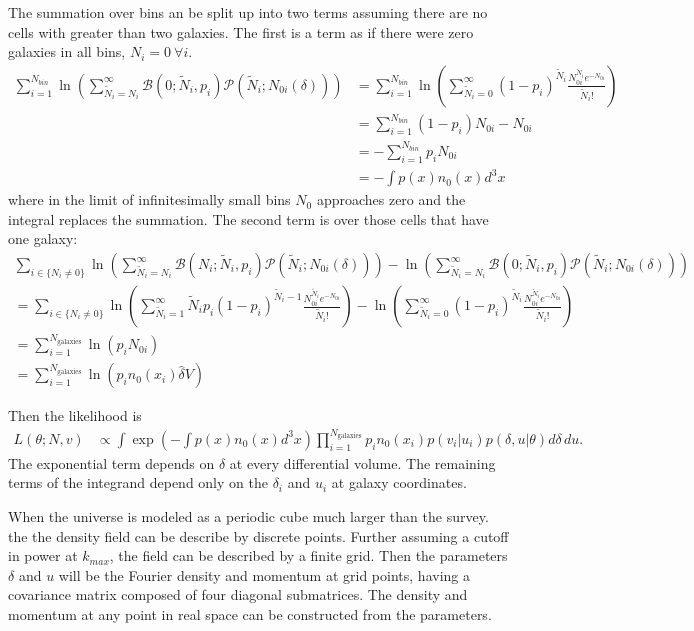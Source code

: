 \documentclass{article}
\begin{document}
The summation over bins an be split up into two terms assuming there are no cells with greater than two galaxies.
The first is a term as if there were zero galaxies in all bins, $N_i=0\ \forall i$.
\begin{align}
 \sum_{i=1}^{N_{bin}} \ln{  \left( \sum_{\tilde{N}_i =N_i}^\infty  \mathcal{B}(0; \tilde{N}_i, p_i) \mathcal{P}(\tilde{N}_i ; N_{0i}(\delta))\right)} & =
\sum_{i=1}^{N_{bin}} \ln{  \left( \sum_{\tilde{N}_i =0}^\infty   (1-p_i)^{ \tilde{N}_i} \frac{N_{0i}^{\tilde{N}_i} e^{-N_{0i}}}{\tilde{N}_i!} \right)}\\ 
& = \sum_{i=1}^{N_{bin}} (1-p_i)N_{0i} - N_{0i}\\
& = - \sum_{i=1}^{N_{bin}} p_i N_{0i}  \\
& = - \int  p(x) n_{0}(x) d^3x
\end{align}
where in the limit of  infinitesimally small bins $N_{0}$ approaches zero and
the integral replaces the summation.
The second term is over those cells that have one galaxy:
\begin{align}
\sum_{i \in \{N_i \ne 0\}}
\ln{  \left( \sum_{\tilde{N}_i =N_i}^\infty  \mathcal{B}(N_i; \tilde{N}_i, p_i) \mathcal{P}(\tilde{N}_i ; N_{0i}(\delta))\right)} -
 \ln{  \left( \sum_{\tilde{N}_i =N_i}^\infty  \mathcal{B}(0; \tilde{N}_i, p_i) \mathcal{P}(\tilde{N}_i ; N_{0i}(\delta))\right)}\\
 =\sum_{i \in \{N_i \ne 0\}} \ln{  \left( \sum_{\tilde{N}_i =1}^\infty   \tilde{N}_i p_i (1-p_i)^{ \tilde{N}_i-1} \frac{N_{0i}^{\tilde{N}_i} e^{-N_{0i}}}{\tilde{N}_i!} \right)}
- \ln{  \left( \sum_{\tilde{N}_i =0}^\infty   (1-p_i)^{ \tilde{N}_i} \frac{N_{0i}^{\tilde{N}_i} e^{-N_{0i}}}{\tilde{N}_i!} \right)} \\
 = \sum_{i=1}^{N_{\text{galaxies}}} \ln{  \left(  p_i  {N_{0i} } \right)} \\
  = \sum_{i=1}^{N_{\text{galaxies}}} \ln{  \left(  p_i  n_{0}(x_i) \hat{\delta} V \right)}
\end{align}

Then the likelihood is
\begin{align}
L(\theta; N, v) 
&\propto \int  \exp \left(- \int  p(x) n_{0}(x) d^3x\right)  \prod_{i=1}^{N_{\text{galaxies}}} p_i n_0(x_i) p(v_i| u_i) p(\delta, u | \theta) d\delta\, du .
\end{align}
The exponential term depends on $\delta$ at every differential volume.  The
remaining terms of the integrand depend only on the $\delta_i$ and $u_i$ at galaxy coordinates.

When the universe is modeled as a periodic cube much larger than the survey. the the density field can be describe by discrete points. 
Further assuming a cutoff in power at $k_{max}$, the field can be described by a finite grid.  Then the parameters $\delta$ and $u$ will be
the Fourier density and momentum at grid points, having a covariance matrix composed of four diagonal submatrices. 
The density and momentum at any point in real space can be constructed from the parameters.
\end{document}
